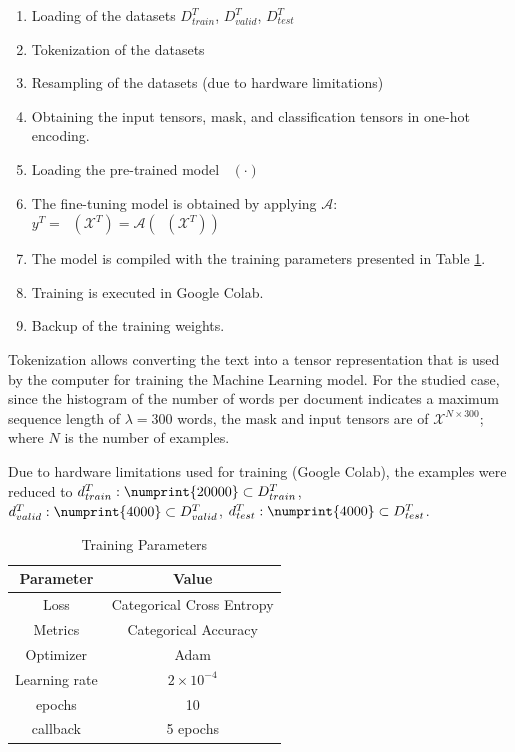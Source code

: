 \documentclass[onecolumn, journal, english, 12pt, a4paper]{IEEEtran} %
\DeclareMathOperator{\ypredtarget}{\phi^{T}}
\DeclareMathOperator{\ypredsource}{\phi^{S}}
\theoremstyle{definition}
\begin{document}
\begin{enumerate}
    \item Loading of the datasets $D^T_{train}$, $D^T_{valid}$, $D^T_{test}$
    \item Tokenization of the datasets
    \item Resampling of the datasets (due to hardware limitations)
    \item Obtaining the input tensors, mask, and classification
      tensors in one-hot encoding.
    \item Loading the pre-trained model $\ypredsource(\cdot)$
    \item The fine-tuning model is obtained by applying $\mathcal{A}$: $y^T = \ypredtarget(\mathbf{\mathcal{X}}^T) =  \mathcal{A}(\ypredsource(\mathbf{\mathcal{X}}^T))$
    \item The model is compiled with the training parameters presented
      in Table \ref{tab:trainingParam}.
    \item Training is executed in Google Colab.
    \item Backup of the training weights.
\end{enumerate}

Tokenization allows converting the text into a tensor representation
that is used by the computer for training the Machine Learning
model. For the studied case, since the histogram of the number of
words per document indicates a maximum sequence length of
$\lambda = 300$ words, the mask and input tensors are of
$\mathbf{\mathcal{X}}^{N\times300}$; where $N$ is the number of
examples.

Due to hardware limitations used for training (Google Colab), the
examples were reduced to
$d^T_{train}:\numprint{20000} \subset D^T_{train}$,
$d^T_{valid}:\numprint{4000} \subset D^T_{valid}$,
$d^T_{test}:\numprint{4000} \subset D^T_{test}$.

\begin{table}[!t]
\renewcommand{\arraystretch}{1.3}
\caption{Training Parameters}
\label{tab:trainingParam}
\centering
\begin{tabular}{cc}
\hline
Parameter & Value\\
\hline
Loss & Categorical Cross Entropy\\
Metrics & Categorical Accuracy \\
Optimizer & Adam \\
Learning rate & $2 \times 10^{-4}$ \\
epochs & 10 \\
callback & 5 epochs \\
\hline
\end{tabular}
\end{table}
\end{document}
